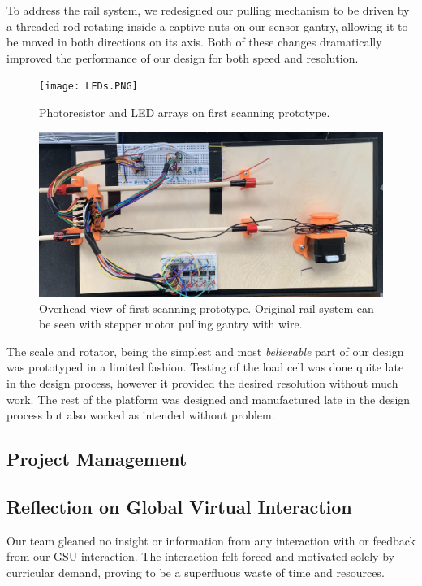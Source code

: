 \documentclass[12pt]{article}
\begin{document}
\begin{multicols*}{2}
            To address the rail system, we redesigned our pulling mechanism to be driven by a threaded rod rotating inside a captive nuts on our sensor gantry, allowing it to be moved in both directions on its axis. Both of these changes dramatically improved the performance of our design for both speed and resolution.

            \begin{figure}[H]
                \centering\texttt{[image: LEDs.PNG]}
                \captionsetup{width=\linewidth}
                \caption{Photoresistor and LED arrays on first scanning prototype.}
                \label{fig:LEDs}
            \end{figure}
            
            \begin{figure}[H]
                \centering\includegraphics[width=\linewidth]{BirdsEye.PNG}
                \captionsetup{width=\linewidth}
                \caption{Overhead view of first scanning prototype. Original rail system can be seen with stepper motor pulling gantry with wire.}
                \label{fig:Overhead}
            \end{figure}

            The scale and rotator, being the simplest and most \textit{believable} part of our design was prototyped in a limited fashion. Testing of the load cell was done quite late in the design process, however it provided the desired resolution without much work. The rest of the platform was designed and manufactured late in the design process but also worked as intended without problem.

        \subsection{Project Management}
            
        \subsection{Reflection on Global Virtual Interaction}
            Our team gleaned no insight or information from any interaction with or feedback from our GSU interaction. The interaction felt forced and motivated solely by curricular demand, proving to be a superfluous waste of time and resources.
            

\end{multicols*}
\end{document}
